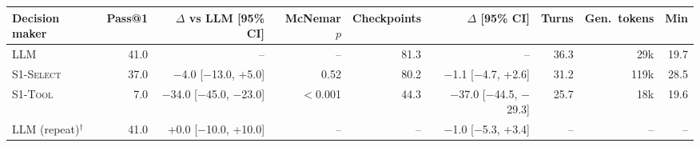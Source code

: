 \begin{tabular}{lrrrrrrrr}
\toprule
Decision maker & Pass@1 & $\Delta$ vs \textsc{LLM} [95\% CI] & McNemar $p$ & Checkpoints & $\Delta$ [95\% CI] & Turns & Gen.\ tokens & Min \\
\midrule
\textsc{LLM} & 41.0 & -- & -- & 81.3 & -- & 36.3 & 29k & 19.7 \\
\textsc{S1-Select} & 37.0 & $-$4.0 [$-$13.0, +5.0] & 0.52 & 80.2 & $-$1.1 [$-$4.7, +2.6] & 31.2 & 119k & 28.5 \\
\textsc{S1-Tool} & 7.0 & $-$34.0 [$-$45.0, $-$23.0] & $<$0.001 & 44.3 & $-$37.0 [$-$44.5, $-$29.3] & 25.7 & 18k & 19.6 \\
\textsc{LLM} (repeat)$^\dagger$ & 41.0 & +0.0 [$-$10.0, +10.0] & -- & -- & $-$1.0 [$-$5.3, +3.4] & -- & -- & -- \\
\bottomrule
\end{tabular}

